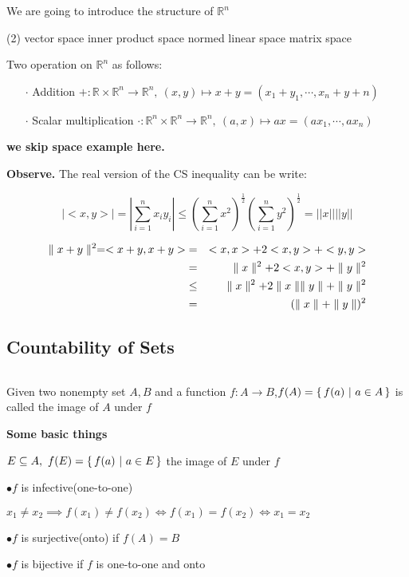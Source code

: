 We are going to introduce the structure of $\mathbb R^n$

\begin{tasks}(2)
	\task[$\cdot$] vector space
	\task[$\cdot$] inner product space
	\task[$\cdot$] normed linear space
	\task[$\cdot$] matrix space
\end{tasks}

\begin{defn}
	Two operation on $\mathbb R^n$ as follows:
	
	\begin{enumerate}
		\item[$\cdot$] Addition $+:\mathbb R \times \mathbb R^n \rightarrow \mathbb R^n ,~(x,y) \mapsto x+y = (x_1+y_1,\cdots,x_n+y+n)$
		\item[$\cdot$] Scalar multiplication $\cdot:\mathbb R^n \times \mathbb R^n \rightarrow \mathbb R^n,~(a,x) \mapsto ax=(ax_1,\cdots,ax_n)$ 
	\end{enumerate}
\end{defn}

\textbf{\color{red} we skip space example here.}

\textbf{Observe.} The real version of the CS inequality can be write:

$$|<x,y>| = |\sum^n_{i=1}x_iy_i| \leq (\sum^n_{i=1}x^2)^{\frac{1}{2}}(\sum^n_{i=1}y^2)^{\frac{1}{2}} = ||x||||y||$$

\begin{eqnarray*}
	\parallel x+y \parallel^2 = <x+y,x+y> &=& <x,x> + 2<x,y> + <y,y>\\
	&=& \parallel x \parallel^2 + 2<x,y> + \parallel y \parallel^2\\
	&\leq& \parallel x \parallel^2 + 2\parallel x \parallel\parallel y \parallel + \parallel y \parallel^2\\
	&=& (\parallel x \parallel+\parallel y \parallel)^2
\end{eqnarray*}

\subsection{Countability of Sets}$ $

Given two nonempty set $A,B$ and a function $f:A \rightarrow B$,$f(A) = \left\{ \,f(a)~|~a \in A \,\right\}$ is called the image of $A$ under $f$

\textbf{Some basic things}
\begin{tcolorbox}
	$E \subseteq A,~f(E) = \left\{ \,f(a)~|~a \in E \,\right\}$ the image of $E$ under $f$
	
	$\bullet$$f$ is infective(one-to-one) 
	
	$x_1 \neq x_2 \implies f(x_1) \neq f(x_2) \Leftrightarrow f(x_1) = f(x_2) \Leftrightarrow x_1 = x_2$
	
	$\bullet$$f$ is surjective(onto) if $f(A) = B$
	
	$\bullet$$f$ is bijective if $f$ is one-to-one and onto
\end{tcolorbox}

